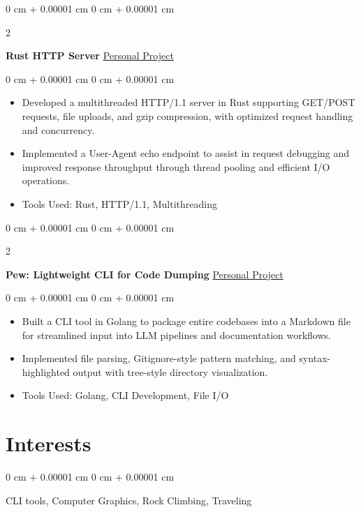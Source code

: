 \documentclass[10pt, letterpaper]{article}
\newenvironment{highlights}{
    \begin{itemize}[
        topsep=0.10 cm,
        parsep=0.10 cm,
        partopsep=0pt,
        itemsep=0pt,
        leftmargin=0 cm + 10pt
    ]
}{
    \end{itemize}
} %
\newenvironment{onecolentry}{
    \begin{adjustwidth}{
        0 cm + 0.00001 cm
    }{
        0 cm + 0.00001 cm
    }
}{
    \end{adjustwidth}
} %
\newenvironment{twocolentry}[2][]{
    \onecolentry
    \def\secondColumn{#2}
    \setcolumnwidth{\fill, 4.5 cm}
    \begin{paracol}{2}
}{
    \switchcolumn \raggedleft \secondColumn
    \end{paracol}
    \endonecolentry
} %
\begin{document}
                \vspace{0.2 cm} 
        \begin{twocolentry}{
            \href{https://github.com/yuann3/http-rust/}{Personal Project}
        }
            \textbf{Rust HTTP Server}\end{twocolentry}

        \vspace{0.10 cm}
        \begin{onecolentry}
            \begin{highlights}
                \item Developed a multithreaded HTTP/1.1 server in Rust supporting GET/POST requests, file uploads, and gzip compression, with optimized request handling and concurrency.
                \item Implemented a User-Agent echo endpoint to assist in request debugging and improved response throughput through thread pooling and efficient I/O operations.
                \item Tools Used: Rust, HTTP/1.1, Multithreading
            \end{highlights}
        \end{onecolentry}


        \vspace{0.2 cm} 

        \begin{twocolentry}{
            \href{https://github.com/yuann3/Pew/}{Personal Project}
        }
            \textbf{Pew: Lightweight CLI for Code Dumping}\end{twocolentry}

        \vspace{0.10 cm}
        \begin{onecolentry}
            \begin{highlights}
                \item Built a CLI tool in Golang to package entire codebases into a Markdown file for streamlined input into LLM pipelines and documentation workflows.
                \item Implemented file parsing, Gitignore-style pattern matching, and syntax-highlighted output with tree-style directory visualization.
                \item Tools Used: Golang, CLI Development, File I/O
            \end{highlights}
        \end{onecolentry}


        \vspace{0.2 cm}
        
         \section{Interests}
        \begin{onecolentry}
            CLI tools, Computer Graphics, Rock Climbing, Traveling
        \end{onecolentry}
\end{document}
